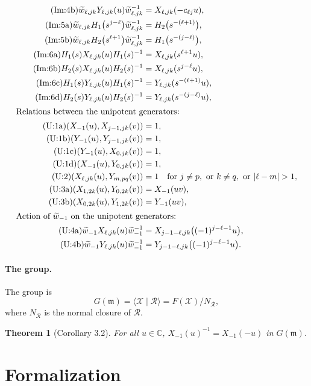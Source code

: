 \documentclass[11pt]{article}
\newtheorem{theorem}{Theorem}[section]
\theoremstyle{definition}
\theoremstyle{remark}
\newcommand{\wt}{\widetilde{w}}
\newcommand{\cX}{\mathcal{X}}
\newcommand{\cR}{\mathcal{R}}
\begin{document}
\begin{align*}
\tag{Im:4b} \wt_{\ell,jk}Y_{\ell,jk}(u)\wt_{\ell,jk}^{-1}&=X_{\ell,jk}(-c_{\ell j}u),\\
\tag{Im:5a} \wt_{\ell,jk}H_1\bigl(s^{j-\ell}\bigr)\wt_{\ell,jk}^{-1}&=H_2\bigl(s^{-(\ell+1)}\bigr),\\
\tag{Im:5b} \wt_{\ell,jk}H_2\bigl(s^{\ell+1}\bigr)\wt_{\ell,jk}^{-1}&=H_1\bigl(s^{-(j-\ell)}\bigr),\\
\tag{Im:6a} H_1(s)X_{\ell,jk}(u)H_1(s)^{-1}&=X_{\ell,jk}(s^{\ell+1}u),\\
\tag{Im:6b} H_2(s)X_{\ell,jk}(u)H_2(s)^{-1}&=X_{\ell,jk}(s^{j-\ell}u),\\
\tag{Im:6c} H_1(s)Y_{\ell,jk}(u)H_1(s)^{-1}&=Y_{\ell,jk}(s^{-(\ell+1)}u),\\
\tag{Im:6d} H_2(s)Y_{\ell,jk}(u)H_2(s)^{-1}&=Y_{\ell,jk}(s^{-(j-\ell)}u),\\
\intertext{Relations between the unipotent generators:}
\tag{U:1a} (X_{-1}(u),X_{j-1,jk}(v))&=1,\\
\tag{U:1b} (Y_{-1}(u),Y_{j-1,jk}(v))&=1,\\
\tag{U:1c} (Y_{-1}(u),X_{0,jk}(v))&=1,\\
\tag{U:1d} (X_{-1}(u),Y_{0,jk}(v))&=1,\\
\tag{U:2} (X_{\ell,jk}(u),Y_{m,pq}(v))&=1\quad\text{for } j\neq p,\text{ or } k\neq q,\text{ or } |\ell-m|>1,\\
\tag{U:3a} (X_{1,2k}(u),Y_{0,2k}(v))&=X_{-1}(uv),\\
\tag{U:3b} (X_{0,2k}(u),Y_{1,2k}(v))&=Y_{-1}(uv),\\
\intertext{Action of $\wt_{-1}$ on the unipotent generators:}
\tag{U:4a} \wt_{-1}X_{\ell,jk}(u)\wt_{-1}^{-1}&=X_{j-1-\ell,jk}\bigl((-1)^{j-\ell-1}u\bigr),\\
\tag{U:4b} \wt_{-1}Y_{\ell,jk}(u)\wt_{-1}^{-1}&=Y_{j-1-\ell,jk}\bigl((-1)^{j-\ell-1}u\bigr).
\end{align*}
\endgroup

\paragraph{The group.} The group is
\[
G(\mathfrak{m})=\langle\cX\mid\cR\rangle=F(\cX)/N_\cR,
\]
where $N_\cR$ is the normal closure of $\cR$.

\begin{theorem}[Corollary 3.2]
For all $u\in\mathbb{C}$, $X_{-1}(u)^{-1}=X_{-1}(-u)$ in $G(\mathfrak{m})$.
\end{theorem}

\section{Formalization}
\end{document}
